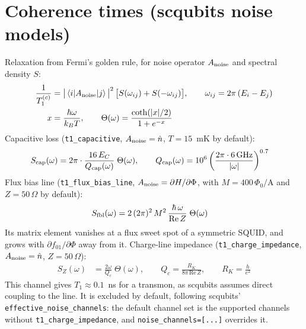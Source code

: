\documentclass[11pt]{article}
\begin{document}
\section*{Coherence times (scqubits noise models)}
Relaxation from Fermi's golden rule, for noise operator $A_{\rm noise}$ and spectral density $S$:
\begin{align}
  \frac{1}{T_1^{(c)}} &= \big|\braket{i|A_{\rm noise}|j}\big|^2\,\big[S(\omega_{ij}) + S(-\omega_{ij})\big],
  \qquad \omega_{ij} = 2\pi\,(E_i - E_j) \\
  x &= \frac{\hbar\omega}{k_BT}, \qquad
  \Theta(\omega) = \frac{\coth(|x|/2)}{1 + e^{-x}}
\end{align}
Capacitive loss (\texttt{t1\_capacitive}, $A_{\rm noise} = \hat n$, $T = 15$~mK by default):
\begin{align}
  S_{\rm cap}(\omega) &= 2\pi\cdot\frac{16\,E_C}{Q_{\rm cap}(\omega)}\;\Theta(\omega), \qquad
  Q_{\rm cap}(\omega) = 10^{6}\left(\frac{2\pi\cdot 6\,\text{GHz}}{|\omega|}\right)^{0.7}
\end{align}
Flux bias line (\texttt{t1\_flux\_bias\_line}, $A_{\rm noise} = \partial H/\partial\Phi$, with
$M = 400\,\Phi_0/\text{A}$ and $Z = 50\,\Omega$ by default):
\begin{align}
  S_{\rm fbl}(\omega) &= 2\,(2\pi)^2\,M^2\,\frac{\hbar\,\omega}{\mathrm{Re}\,Z}\;\Theta(\omega)
\end{align}
Its matrix element vanishes at a flux sweet spot of a symmetric SQUID, and grows with
$\partial f_{01}/\partial\Phi$ away from it.
Charge-line impedance (\texttt{t1\_charge\_impedance}, $A_{\rm noise} = \hat n$, $Z = 50\,\Omega$):
\begin{align}
  S_{Z}(\omega) &= \frac{2\omega}{Q_c}\;\Theta(\omega), \qquad
  Q_c = \frac{R_K}{8\pi\,\mathrm{Re}\,Z}, \qquad R_K = \frac{h}{e^2}
\end{align}
This channel gives $T_1 \approx 0.1$~ns for a transmon, as scqubits assumes direct coupling to
the line. It is excluded by default, following scqubits' \texttt{effective\_noise\_channels}: the
default channel set is the supported channels without \texttt{t1\_charge\_impedance}, and
\texttt{noise\_channels=[...]} overrides it.
\end{document}
